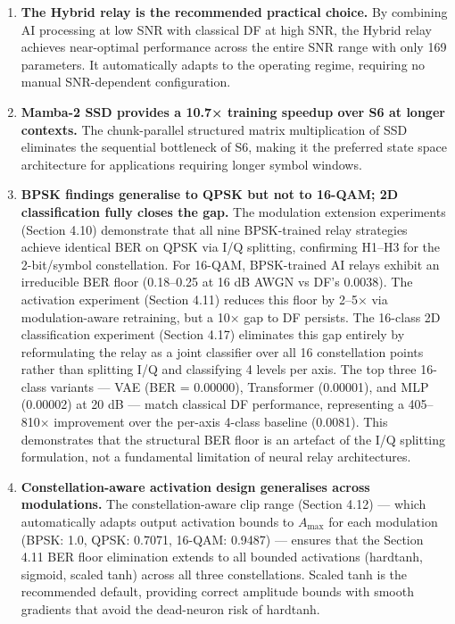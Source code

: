 \documentclass[
  english,
  12pt,
  12pt,
  a4paper,
  oneside]{report}
\begin{document}
\begin{enumerate}
  \textbf{MMSE-SIC provides the best MIMO equalization.} The non-linear SIC technique consistently outperforms both ZF and MMSE for all relay types, confirming the benefit of successive interference cancellation in the spatial multiplexing setting. The equalization gains are additive to the relay processing gains.
\item
  \textbf{The Hybrid relay is the recommended practical choice.} By combining AI processing at low SNR with classical DF at high SNR, the Hybrid relay achieves near-optimal performance across the entire SNR range with only 169 parameters. It automatically adapts to the operating regime, requiring no manual SNR-dependent configuration.
\item
  \textbf{Mamba-2 SSD provides a 10.7× training speedup over S6 at longer contexts.} The chunk-parallel structured matrix multiplication of SSD eliminates the sequential bottleneck of S6, making it the preferred state space architecture for applications requiring longer symbol windows.
\item
  \textbf{BPSK findings generalise to QPSK but not to 16-QAM; 2D classification fully closes the gap.} The modulation extension experiments (Section 4.10) demonstrate that all nine BPSK-trained relay strategies achieve identical BER on QPSK via I/Q splitting, confirming H1--H3 for the 2-bit/symbol constellation. For 16-QAM, BPSK-trained AI relays exhibit an irreducible BER floor (0.18--0.25 at 16 dB AWGN vs DF's 0.0038). The activation experiment (Section 4.11) reduces this floor by 2--5× via modulation-aware retraining, but a 10× gap to DF persists. The 16-class 2D classification experiment (Section 4.17) eliminates this gap entirely by reformulating the relay as a joint classifier over all 16 constellation points rather than splitting I/Q and classifying 4 levels per axis. The top three 16-class variants --- VAE (BER = 0.00000), Transformer (0.00001), and MLP (0.00002) at 20 dB --- match classical DF performance, representing a 405--810× improvement over the per-axis 4-class baseline (0.0081). This demonstrates that the structural BER floor is an artefact of the I/Q splitting formulation, not a fundamental limitation of neural relay architectures.
\item
  \textbf{Constellation-aware activation design generalises across modulations.} The constellation-aware clip range (Section 4.12) --- which automatically adapts output activation bounds to \(A_{\max}\) for each modulation (BPSK: 1.0, QPSK: 0.7071, 16-QAM: 0.9487) --- ensures that the Section 4.11 BER floor elimination extends to all bounded activations (hardtanh, sigmoid, scaled tanh) across all three constellations. Scaled tanh is the recommended default, providing correct amplitude bounds with smooth gradients that avoid the dead-neuron risk of hardtanh.

\end{enumerate}
\end{document}
